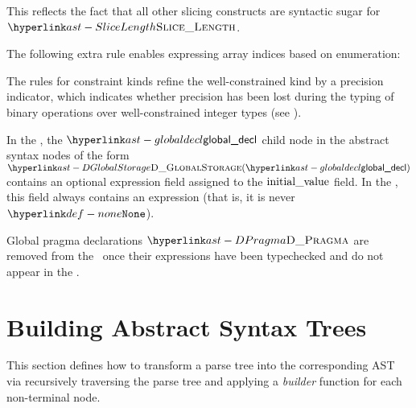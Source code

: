 This reflects the fact that all other slicing constructs are syntactic sugar
for \\
$\SliceLength$.

The following extra rule enables expressing array indices based on enumeration:

The rules for constraint kinds refine the well-constrained kind by a precision
indicator, which indicates whether precision has been lost during the typing of
binary operations over well-constrained integer types (see ).
\hypertarget{ast-typedWellConstrained}{}
\BackupOriginalAST{
\begin{flalign*}
\precisionlossindicator \derives\ & \PrecisionFull & \\
                                |\ & \PrecisionLost & \\
        \constraintkind \derives\ & \WellConstrained(\intconstraint^{+}, \precisionlossindicator) & \\
\end{flalign*}
}

In the \untypedast, the $\globaldecl$ child node in the abstract syntax nodes of the form $\DGlobalStorage(\globaldecl)$
contains an optional expression field assigned to the $\text{initial\_value}$ field. In the \typedast, this field
always contains an expression (that is, it is never $\None$).

Global pragma declarations $\DPragma$ are removed from the \untypedast\ once their expressions have been typechecked and do not appear in the \typedast.

\section{Building Abstract Syntax Trees\label{sec:BuildingAbstractSyntaxTrees}}
This section defines how to transform a parse tree into the corresponding AST
via recursively traversing the parse tree and applying a \emph{builder} function
for each non-terminal node.

